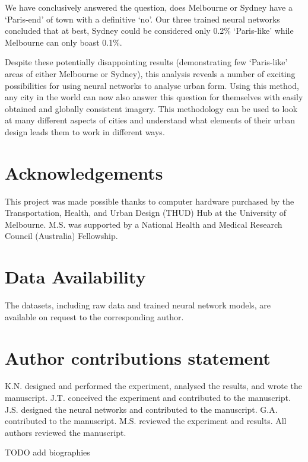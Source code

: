 \documentclass[Crown,sageh,times]{sagej}
\begin{document}
We have conclusively answered the question, does Melbourne or Sydney have a `Paris-end' of town with a definitive `no'. Our three trained neural networks concluded that at best, Sydney could be considered only 0.2\% `Paris-like' while Melbourne can only boast 0.1\%.   

Despite these potentially disappointing results (demonstrating few `Paris-like' areas of either Melbourne or Sydney), this analysis reveals a number of exciting possibilities for using neural networks to analyse urban form. Using this method, any city in the world can now also answer this question for themselves with easily obtained and globally consistent imagery. This methodology can be used to look at many different aspects of cities and understand what elements of their urban design leads them to work in different ways.

\section{Acknowledgements}
This project was made possible thanks to computer hardware purchased by the Transportation, Health, and Urban Design (THUD) Hub at the University of Melbourne. M.S. was supported by a National Health and Medical Research Council (Australia) Fellowship.

\section{Data Availability}\label{sec:methods6} 
The datasets, including raw data and trained neural network models, are available on request to the corresponding author.

\section{Author contributions statement}

K.N. designed and performed the experiment, analysed the results, and wrote the manuscript. J.T. conceived the experiment and contributed to the manuscript. J.S. designed the neural networks and contributed to the manuscript. G.A. contributed to the manuscript. M.S. reviewed the experiment and results. All authors reviewed the manuscript. 



\theendnotes

  
  

\begin{biogs}
TODO add biographies
\end{biogs}
\end{document}

